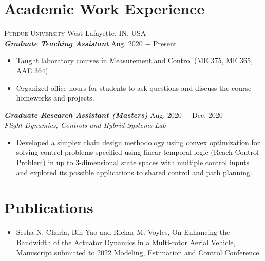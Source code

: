 \documentclass[letterpaper,10pt]{article}
\begin{document}
\section{Academic Work Experience}
\noindent \textsc{Purdue University} \hfill West Lafayette, IN, USA \\
\vspace{3pt}
\noindent \textbf{\textit{Graduate Teaching Assistant}} \hfill Aug. 2020 $-$ Present\\
\begin{itemize}[noitemsep,nolistsep,leftmargin=0.25in,label={--}]
    \item Taught laboratory courses in Measurement and Control (ME 375, ME 365, AAE 364).
    \item Organized office hours for students to ask questions and discuss the course homeworks and projects.
\end{itemize}
\vspace{3pt}
\noindent \textbf{\textit{Graduate Research Assistant (Masters)}} \hfill Aug. 2020 $-$ Dec. 2020\\
\textit{Flight Dynamics, Controls and Hybrid Systems Lab}
\begin{itemize}[noitemsep,nolistsep,leftmargin=0.25in,label={--}]
	\item Developed a simplex chain design methodology using convex optimization for solving control problems specified using linear temporal logic (Reach Control Problem) in up to 3-dimensional state spaces with multiple control inputs and explored its possible applications to shared control and path planning.
\end{itemize}

\section{Publications}
\begin{itemize}[noitemsep,nolistsep,leftmargin=0.25in,label={}]
\item Sesha N. Charla, Bin Yao and Richar M. Voyles, On Enhancing the Bandwidth
of the Actuator Dynamics in a Multi-rotor Aerial Vehicle, Manuscript submitted to 2022 Modeling, Estimation and Control Conference.
\end{itemize}


\end{document}
